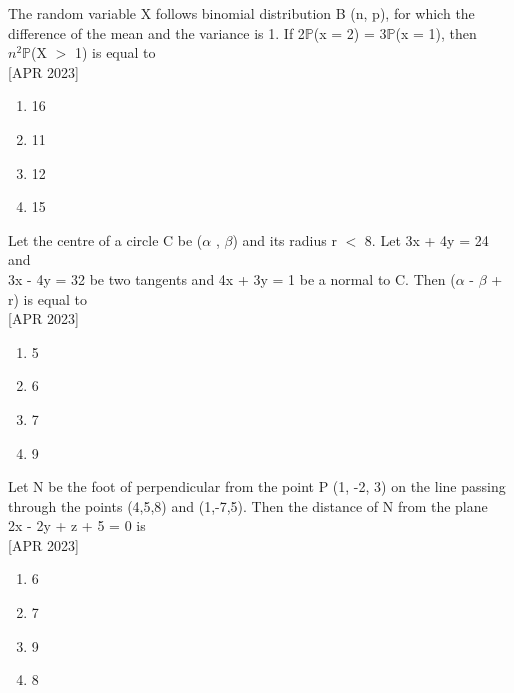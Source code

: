 \iffalse
  \title{Assignment}
  \author{ee24btech11030}
  \section{mcq-single}
\fi

\item The random variable X follows binomial distribution B (n, p), for which the difference of the mean and the variance is 1. If 2$\mathbb{P}$(x = 2) = 3$\mathbb{P}$(x = 1), then \\$n^2\mathbb{P}$(X $>$ 1) is equal to  \\\hfill{[APR 2023]} 
    \begin{multicols}{4}
    \begin{enumerate}
        \item 16
        \item 11
        \item 12
        \item 15
    \end{enumerate}
    \end{multicols}
    \bigskip
    \item Let the centre of a circle C be ($\alpha$ , $\beta$) and its radius r $<$ 8. Let 3x + 4y = 24 and\\ 3x - 4y = 32 be two tangents and 4x + 3y = 1 be a normal to C. Then ($\alpha$ - $\beta$ + r) is equal to  \\\hfill{[APR 2023]}
    \begin{multicols}{4}
    \begin{enumerate}
        \item 5
        \item 6
        \item 7
        \item 9
    \end{enumerate} 
    \end{multicols}
    \bigskip
    \item Let N be the foot of perpendicular from the point P (1, -2, 3) on the line passing through the points (4,5,8) and (1,-7,5). Then the distance of N from the plane\\ 2x - 2y + z + 5 = 0 is  \\\hfill{[APR 2023]}
    \begin{multicols}{4}
    \begin{enumerate}
        \item 6
        \item 7
        \item 9
        \item 8
    \end{enumerate}
    \end{multicols}
